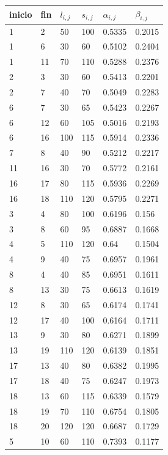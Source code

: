 \documentclass[letter, 10pt]{article}
\begin{document}
\begin{table}[H]
\centering
\begin{tabular}{|l|l|l|l|l|l|}
\hline
inicio & fin & $l_{i,j}$ & $s_{i,j}$ & $\alpha_{i,j}$ & $\beta_{i,j}$ \\ \hline
1 & 2 & 50 & 100 & 0.5335 & 0.2015 \\ \hline
1 & 6 & 30 & 60 & 0.5102 & 0.2404 \\ \hline
1 & 11 & 70 & 110 & 0.5288 & 0.2376 \\ \hline
2 & 3 & 30 & 60 & 0.5413 & 0.2201 \\ \hline
2 & 7 & 40 & 70 & 0.5049 & 0.2283 \\ \hline
6 & 7 & 30 & 65 & 0.5423 & 0.2267 \\ \hline
6 & 12 & 60 & 105 & 0.5016 & 0.2193 \\ \hline
6 & 16 & 100 & 115 & 0.5914 & 0.2336 \\ \hline
7 & 8 & 40 & 90 & 0.5212 & 0.2217 \\ \hline
11 & 16 & 30 & 70 & 0.5772 & 0.2161 \\ \hline
16 & 17 & 80 & 115 & 0.5936 & 0.2269 \\ \hline
16 & 18 & 110 & 120 & 0.5795 & 0.2271 \\ \hline
3 & 4 & 80 & 100 & 0.6196 & 0.156 \\ \hline
3 & 8 & 60 & 95 & 0.6887 & 0.1668 \\ \hline
4 & 5 & 110 & 120 & 0.64 & 0.1504 \\ \hline
4 & 9 & 40 & 75 & 0.6957 & 0.1961 \\ \hline
8 & 4 & 40 & 85 & 0.6951 & 0.1611 \\ \hline
8 & 13 & 30 & 75 & 0.6613 & 0.1619 \\ \hline
12 & 8 & 30 & 65 & 0.6174 & 0.1741 \\ \hline
12 & 17 & 40 & 100 & 0.6164 & 0.1711 \\ \hline
13 & 9 & 30 & 80 & 0.6271 & 0.1899 \\ \hline
13 & 19 & 110 & 120 & 0.6139 & 0.1851 \\ \hline
17 & 13 & 40 & 80 & 0.6382 & 0.1995 \\ \hline
17 & 18 & 40 & 75 & 0.6247 & 0.1973 \\ \hline
18 & 13 & 60 & 115 & 0.6339 & 0.1579 \\ \hline
18 & 19 & 70 & 110 & 0.6754 & 0.1805 \\ \hline
18 & 20 & 120 & 120 & 0.6687 & 0.1729 \\ \hline
5 & 10 & 60 & 110 & 0.7393 & 0.1177 \\ \hline

\end{tabular}
\end{table}
\end{document}
